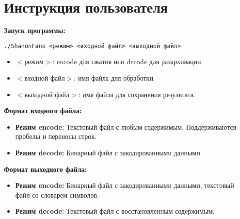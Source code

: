 \documentclass[a4paper,14pt]{article}
\begin{document}
\newpage
\section{Инструкция пользователя}
\textbf{Запуск программы:}
\begin{verbatim}
./ShanonFano <режим> <входной файл> <выходной файл>
\end{verbatim}
\begin{itemize}
    \item $<$режим$>$: encode для сжатия или decode для разархивации.
    \item $<$входной файл$>$: имя файла для обработки.
    \item $<$выходной файл$>$: имя файла для сохранения результата.
\end{itemize}

\textbf{Формат входного файла:}
\begin{itemize}
    \item \textbf{Режим encode:} Текстовый файл с любым содержимым. Поддерживаются пробелы и переносы строк.
    \item \textbf{Режим decode:} Бинарный файл с закодированными данными.
\end{itemize}

\textbf{Формат выходного файла:}
\begin{itemize}
    \item \textbf{Режим encode:} Бинарный файл с закодированными данными, текстовый файл со словарем символов.
    \item \textbf{Режим decode:} Текстовый файл с восстановленным содержимым.
\end{itemize}

\newpage
\end{document}

